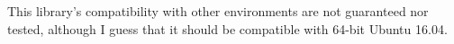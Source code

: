 \documentclass{article}
\begin{document}
This library's compatibility with other environments are not guaranteed nor tested, although I guess that it should be compatible with 64-bit Ubuntu 16.04.
  
%
%
%
%
\end{document}
